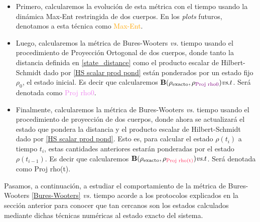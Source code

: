 \documentclass{report} %
\numberwithin{equation}{section}
\begin{document}
\begin{itemize}
    \item Primero, calcularemos la evolución de esta métrica con el tiempo usando la dinámica Max-Ent restringida de dos cuerpos. 
    En los \textit{plots} futuros, denotamos a esta técnica como \textcolor{orange}{Max-Ent}.
    \item Luego, calcularemos la métrica de Bures-Wooters \textit{vs.} tiempo usando el procedimiento de Proyección Ortogonal de dos cuerpos, donde tanto la distancia definida en \eqref{state_distance} como el producto escalar de Hilbert-Schmidt dado por \eqref{HS scalar prod pond} están ponderados por un estado fijo $\rho_0$, el estado inicial. Es decir que calcularemos ${\bf B}(\rho_{\textnormal{exacto}}, \rho_{\textnormal{\textcolor{violet}{Proj rho0}}}) \textit{vs}. t$.  Será denotada como \textcolor{violet}{Proj rho0}.
    \item Finalmente, calcularemos la métrica de Bures-Wooters \textit{vs.} tiempo usando el procedimiento de proyección de dos cuerpos, donde ahora se actualizará el estado que pondera la distancia y el producto escalar de Hilbert-Schmidt dado por \eqref{HS scalar prod pond}. Esto es, para calcular el estado $\rho(t_i)$ a tiempo $t_i$, estas cantidades anteriores estarán ponderadas por el estado $\rho(t_{i-1})$. Es decir que calcularemos ${\bf B}(\rho_{\textnormal{exacto}}, \rho_{\textnormal{\textcolor{awesome}{Proj rho(t)}}}) \textit{vs}. t$.    Será denotada como \textcolor{awesome}{Proj rho(t)}.
\end{itemize}

Pasamos, a continuación, a estudiar el comportamiento de la métrica de Bures-Wooters \eqref{Bures-Wooters} \textit{vs.} tiempo acorde a los protocolos explicados en la sección anterior para conocer que tan cercanos son los estados calculados mediante dichas técnicas numéricas al estado exacto del sistema. 
\end{document}
